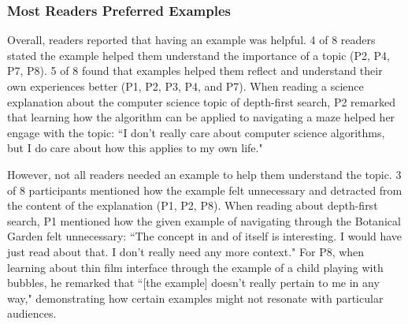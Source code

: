 



\subsubsection{Most Readers Preferred Examples}
Overall, readers reported that having an example was helpful. 4 of 8 readers stated the example helped them understand the importance of a topic (P2, P4, P7, P8). 5 of 8 found that examples helped them reflect and understand their own experiences better (P1, P2, P3, P4, and P7). When reading a science explanation about the computer science topic of depth-first search, P2 remarked that learning how the algorithm can be applied to navigating a maze helped her engage with the topic: ``I don't really care about computer science algorithms, but I do care about how this applies to my own life."

However, not all readers needed an example to help them understand the topic. 3 of 8 participants mentioned how the example felt unnecessary and detracted from the content of the explanation (P1, P2, P8). When reading about depth-first search, P1 mentioned how the given example of navigating through the Botanical Garden felt unnecessary: ``The concept in and of itself is interesting. I would have just read about that. I don't really need any more context." For P8, when learning about thin film interface through the example of a child playing with bubbles, he remarked that ``[the example] doesn't really pertain to me in any way," demonstrating how certain examples might not resonate with particular audiences.


